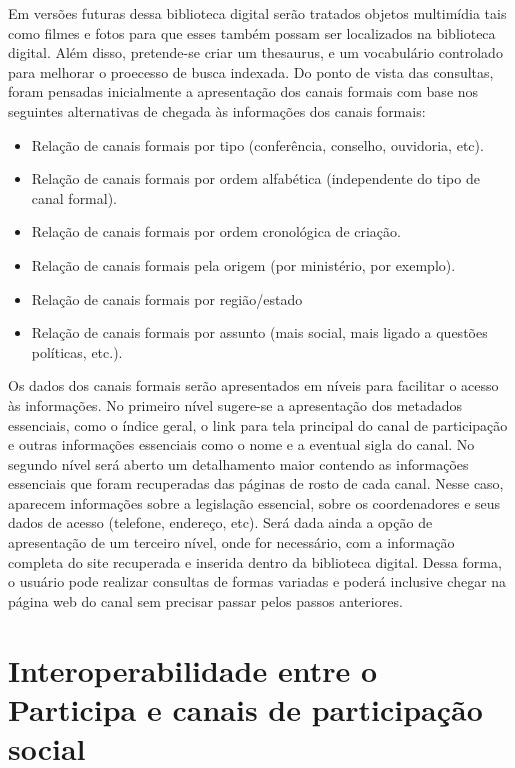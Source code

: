 
Em versões futuras dessa biblioteca digital serão tratados objetos multimídia tais como filmes e fotos para que esses também possam ser localizados na biblioteca digital. Além disso, pretende-se criar um thesaurus, e um vocabulário controlado para melhorar o proecesso de busca indexada. Do ponto de vista das consultas, foram pensadas inicialmente a apresentação dos canais formais com base nos seguintes alternativas de chegada às informações dos canais formais:

\begin{itemize}
	\item Relação de canais formais por tipo (conferência, conselho, ouvidoria, etc). 
	\item Relação de canais formais por ordem alfabética (independente do tipo de canal formal).
	\item Relação de canais formais por ordem cronológica de criação.
	\item Relação de canais formais pela origem (por ministério, por exemplo).
	\item Relação de canais formais por região/estado
	\item Relação de canais formais por assunto (mais social, mais ligado a questões políticas, etc.).
\end{itemize}

Os dados dos canais formais serão apresentados em níveis para facilitar o acesso às informações. No primeiro nível sugere-se a apresentação dos metadados essenciais, como o índice geral, o link para tela principal do canal de participação e outras informações essenciais como o nome e a eventual sigla do canal. No segundo nível será aberto um detalhamento maior contendo as informações essenciais que foram recuperadas das páginas de rosto de cada canal. Nesse caso, aparecem informações sobre a legislação essencial, sobre os coordenadores e seus dados de acesso (telefone, endereço, etc). Será dada ainda a opção de apresentação de um terceiro nível, onde for necessário, com a informação completa do site recuperada e inserida dentro da biblioteca digital. Dessa forma, o usuário pode realizar consultas de formas variadas e poderá inclusive chegar na página web do canal sem precisar passar pelos passos anteriores.

\section{Interoperabilidade entre o Participa e canais de participação social}
\label{sec:interparticipa}

